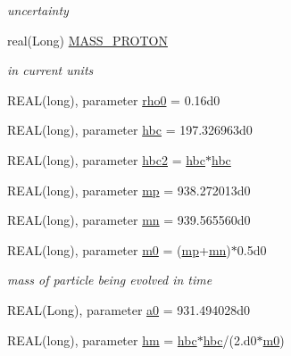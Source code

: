 \begin{DoxyCompactItemize}
\begin{DoxyCompactList}\small\item\em uncertainty \item\end{DoxyCompactList}\item 
real(Long) \hyperlink{namespacephys__cons_a20e8ed3d7ff389588ce024048c5ccf85}{MASS\_\-PROTON}
\begin{DoxyCompactList}\small\item\em in current units \item\end{DoxyCompactList}\item 
REAL(long), parameter \hyperlink{namespacephys__cons_a4b10513970a98ad78b85723c60d9a8b6}{rho0} = 0.16d0
\item 
REAL(long), parameter \hyperlink{namespacephys__cons_a2d3539e3579b581a4e69eff7347b4fa2}{hbc} = 197.326963d0
\item 
REAL(long), parameter \hyperlink{namespacephys__cons_a030a10874bc73b7d042adb32fad75614}{hbc2} = \hyperlink{namespacephys__cons_a2d3539e3579b581a4e69eff7347b4fa2}{hbc}$\ast$\hyperlink{namespacephys__cons_a2d3539e3579b581a4e69eff7347b4fa2}{hbc}
\item 
REAL(long), parameter \hyperlink{namespacephys__cons_ae2a4cb4e421fe399f19d0729b5617fed}{mp} = 938.272013d0
\item 
REAL(long), parameter \hyperlink{namespacephys__cons_ad68aaba74b75e1e13f1367c1eb0904c1}{mn} = 939.565560d0
\item 
REAL(long), parameter \hyperlink{namespacephys__cons_afa35c20a6e2a70b58142d10071eeef10}{m0} = (\hyperlink{namespacephys__cons_ae2a4cb4e421fe399f19d0729b5617fed}{mp}+\hyperlink{namespacephys__cons_ad68aaba74b75e1e13f1367c1eb0904c1}{mn})$\ast$0.5d0
\begin{DoxyCompactList}\small\item\em mass of particle being evolved in time \item\end{DoxyCompactList}\item 
REAL(Long), parameter \hyperlink{namespacephys__cons_a02e8bb2c808e0085a317bf36ff79ae2a}{a0} = 931.494028d0
\item 
REAL(long), parameter \hyperlink{namespacephys__cons_ad97ad749ef4f8f66c56a0facb7394cb5}{hm} = \hyperlink{namespacephys__cons_a2d3539e3579b581a4e69eff7347b4fa2}{hbc}$\ast$\hyperlink{namespacephys__cons_a2d3539e3579b581a4e69eff7347b4fa2}{hbc}/(2.d0$\ast$\hyperlink{namespacephys__cons_afa35c20a6e2a70b58142d10071eeef10}{m0})

\end{DoxyCompactItemize}
